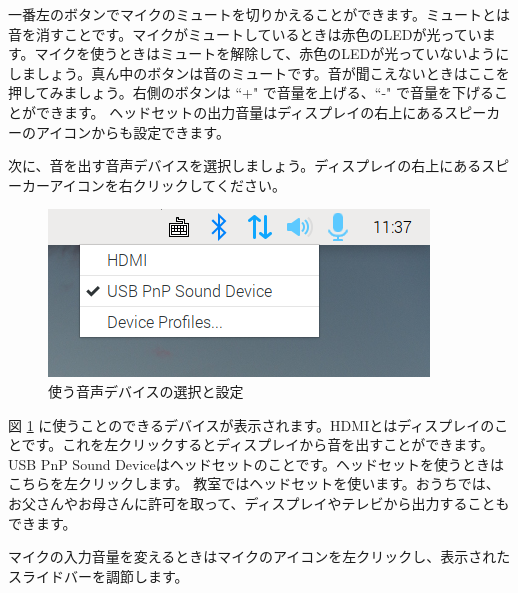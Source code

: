 一番左のボタンでマイクのミュートを切りかえることができます。ミュートとは音を消すことです。マイクがミュートしているときは赤色のLEDが光っています。マイクを使うときはミュートを解除して、赤色のLEDが光っていないようにしましょう。真ん中のボタンは音のミュートです。音が聞こえないときはここを押してみましょう。右側のボタンは ``+" で音量を上げる、``-" で音量を下げることができます。
ヘッドセットの出力音量はディスプレイの右上にあるスピーカーのアイコンからも設定できます。

次に、音を出す音声デバイスを選択しましょう。ディスプレイの右上にあるスピーカーアイコンを右クリックしてください。

\begin{figure}[H]
\begin{center}
    \includegraphics[width=\linewidth]{images/select_sink.png}
    \caption{使う音声デバイスの選択と設定}
    \label{使う音声デバイスの選択と設定}
\end{center}
\end{figure}

図 \ref{使う音声デバイスの選択と設定} に使うことのできるデバイスが表示されます。HDMIとはディスプレイのことです。これを左クリックするとディスプレイから音を出すことができます。USB PnP Sound Deviceはヘッドセットのことです。ヘッドセットを使うときはこちらを左クリックします。
教室ではヘッドセットを使います。おうちでは、お父さんやお母さんに許可を取って、ディスプレイやテレビから出力することもできます。

マイクの入力音量を変えるときはマイクのアイコンを左クリックし、表示されたスライドバーを調節します。

